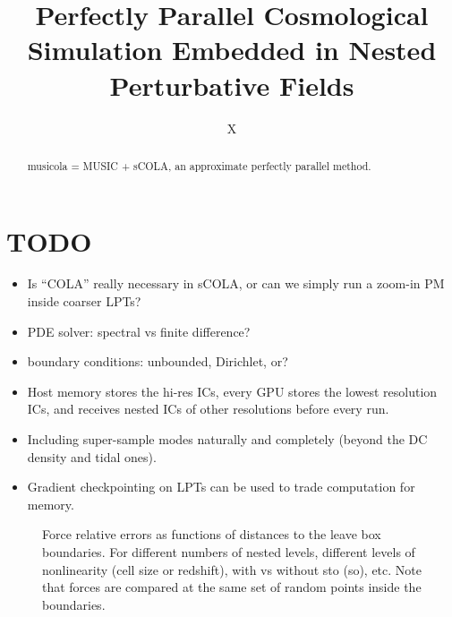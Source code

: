 \documentclass[modern, trackchanges, dvipsnames]{aastex631}
\newcommand{\gkai}[1]{\begin{CJK*}{UTF8}{gkai}\raisebox{.1em}{(}#1\raisebox{.1em}{)}\end{CJK*}}
\begin{document}
\title{\large Perfectly Parallel Cosmological Simulation Embedded in Nested Perturbative Fields
\vspace{0.3em}}


\author[0000-0000-0000-0000]{\normalsize X}
%
%
%







\begin{abstract}

musicola = MUSIC + sCOLA, an approximate perfectly parallel method.

\end{abstract}



\section*{TODO}
\begin{itemize}
\item Is ``COLA'' really necessary in sCOLA, or can we simply run a
  zoom-in PM inside coarser LPTs?
\item PDE solver: spectral vs finite difference?
\item boundary conditions: unbounded, Dirichlet, or?
\item Host memory stores the hi-res ICs, every GPU stores the lowest
  resolution ICs, and receives nested ICs of other resolutions before
  every run.
\item Including super-sample modes naturally and completely (beyond the
  DC density and tidal ones).
\item Gradient checkpointing on LPTs can be used to trade computation
  for memory.
\end{itemize}


\begin{figure*}[tb]
\centering
\caption{Force relative errors as functions of distances to the leave
box boundaries. For different numbers of nested levels, different levels
of nonlinearity (cell size or redshift), with vs without sto (so), etc.
Note that forces are compared at the same set of random points inside
the boundaries.}
\label{fig:error}
\end{figure*}
\end{document}
